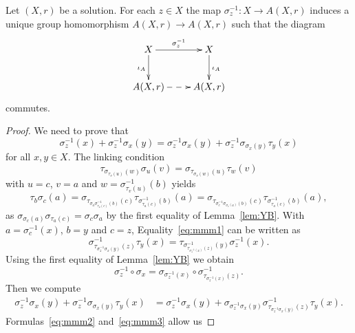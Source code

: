 \begin{lemma}
\label{lem:sigma_inverse}
Let $(X,r)$ be a solution. 
For each $z\in X$ the 
map $\sigma_z^{-1}\colon X\to A(X,r)$ induces a unique 
group homomorphism $A(X,r)\to A(X,r)$ such that
the diagram
\[
\xymatrix{
 X
 \ar[d]_{\iota_A}
 \ar[r]^-{\sigma^{-1}_z}
 & X
 \ar[d]^{\iota_A}
 \\
 A(X,r)
 \ar@{-->}[r]
 & A(X,r)
 }
\]
commutes. 
\end{lemma}

\begin{proof}
We need to prove that 
\[
\sigma^{-1}_z(x)+\sigma^{-1}_z\sigma_x(y)=\sigma^{-1}_z\sigma_x(y)+\sigma^{-1}_z\sigma_{\sigma_x(y)}\tau_y(x)
\]
for all $x,y\in X$. The linking condition
\[
\tau_{\sigma_{\tau_v(u)}(w)}\sigma_u(v)=
\sigma_{\tau_{\sigma_v(w)}(u)}\tau_w(v)
\]
with $u=c$, $v=a$ and $w=\sigma^{-1}_{\tau_v(u)}(b)$ yields
\begin{equation}
\label{eq:mmm1}
    \tau_b\sigma_c(a)=\sigma_{\tau_{\sigma_a\sigma^{-1}_{\tau_a(c)}(b)}(c)}\tau_{\sigma^{-1}_{\tau_a(c)}(b)}(a)=
    \sigma_{\tau_{\sigma^{-1}_c\sigma_{\sigma_c(a)}(b)}(c)}\tau_{\sigma^{-1}_{\tau_a(c)}(b)}(a),
\end{equation}
as $\sigma_{\sigma_c(a)}\sigma_{\tau_a(c)}=\sigma_c\sigma_a$ by the first equality of Lemma~\ref{lem:YB}. 
With $a=\sigma^{-1}_c(x)$, $b=y$ and $c=z$, 
Equality~\eqref{eq:mmm1} can be written as 
\begin{equation}
\label{eq:mmm2}
\sigma^{-1}_{\tau_{\sigma^{-1}_z\sigma_x(y)}(z)}\tau_y(x)
=\tau_{\sigma^{-1}_{\tau_{\sigma^{-1}_z(x)}(z)}(y)}\sigma^{-1}_z(x).
\end{equation}
Using the first equality of Lemma~\ref{lem:YB} we obtain
\begin{equation}
    \label{eq:mmm3}
    \sigma_z^{-1}\circ\sigma_x=\sigma_{\sigma^{-1}_z(x)}\circ\sigma^{-1}_{\tau_{\sigma^{-1}_z(x)}(z)}.
\end{equation}
Then we compute
\begin{align*}
    \sigma^{-1}_z\sigma_x(y)+\sigma^{-1}_z\sigma_{\sigma_x(y)}\tau_y(x)
    &= \sigma^{-1}_z\sigma_x(y)+\sigma_{\sigma^{-1}_z\sigma_x(y)}\sigma^{-1}_{\tau_{\sigma^{-1}_z\sigma_x(y)}(z)}\tau_y(x).
\end{align*}
Formulas~\eqref{eq:mmm2} and~\eqref{eq:mmm3} allow us 

\end{proof}

